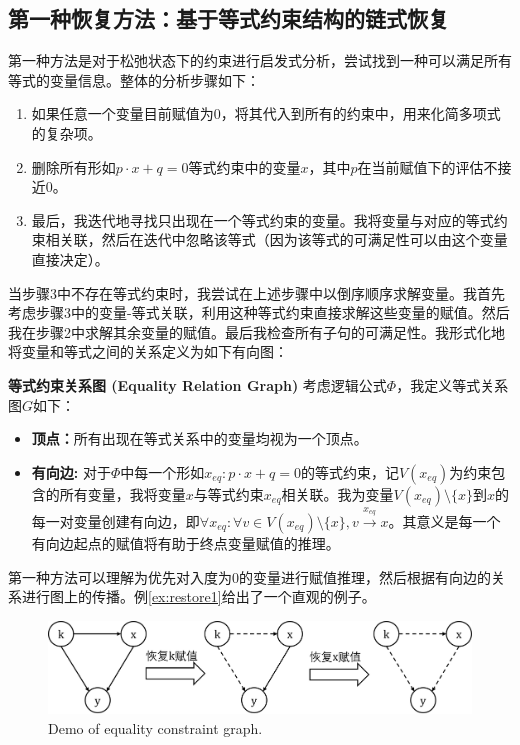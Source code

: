 \subsection{第一种恢复方法：基于等式约束结构的链式恢复}
第一种方法是对于松弛状态下的约束进行启发式分析，尝试找到一种可以满足所有等式的变量信息。整体的分析步骤如下：
\begin{enumerate}
    \item 如果任意一个变量目前赋值为0，将其代入到所有的约束中，用来化简多项式的复杂项。
    \item 删除所有形如$p \cdot x + q = 0$等式约束中的变量$x$，其中$p$在当前赋值下的评估不接近0。
    \item 最后，我迭代地寻找只出现在一个等式约束的变量。我将变量与对应的等式约束相关联，然后在迭代中忽略该等式（因为该等式的可满足性可以由这个变量直接决定）。
\end{enumerate}
当步骤3中不存在等式约束时，我尝试在上述步骤中以倒序顺序求解变量。我首先考虑步骤3中的变量-等式关联，利用这种等式约束直接求解这些变量的赋值。然后我在步骤2中求解其余变量的赋值。最后我检查所有子句的可满足性。我形式化地将变量和等式之间的关系定义为如下有向图：
\begin{definition}{\textbf{等式约束关系图 (Equality Relation Graph)}}
考虑逻辑公式$\Phi$，我定义等式关系图$G$如下：
\begin{itemize}
    \item \textbf{顶点：}所有出现在等式关系中的变量均视为一个顶点。
    \item \textbf{有向边:} 对于$\Phi$中每一个形如$x_{eq}: p \cdot x + q = 0$的等式约束，记$V(x_{eq})$为约束包含的所有变量，我将变量$x$与等式约束$x_{eq}$相关联。我为变量$V(x_{eq}) \setminus \{x\}$到$x$的每一对变量创建有向边，即$\forall x_{eq}: \forall v \in V(x_{eq}) \setminus \{x\}, v \xrightarrow{x_{eq}} x$。其意义是每一个有向边起点的赋值将有助于终点变量赋值的推理。
\end{itemize}
\end{definition}

第一种方法可以理解为优先对入度为0的变量进行赋值推理，然后根据有向边的关系进行图上的传播。例\ref{ex:restore1}给出了一个直观的例子。

\begin{figure}[t]
    \centering
    \includegraphics[width=\columnwidth]{Img/restore1.png}
     {Demo of equality constraint graph.}
\label{fig:restore1}
\end{figure}


